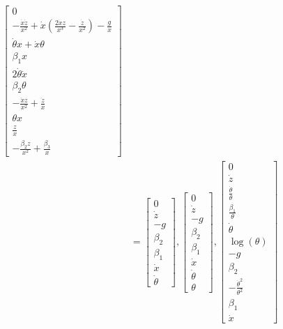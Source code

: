 \documentclass[12pt]{article}
\begin{document}
\begin{align*}
    \left[\begin{matrix}0\\- \frac{\dot{x} \dot{z}}{x^{2}} + \dot{x} \left(\frac{2 \dot{x} z}{x^{3}} - \frac{\dot{z}}{x^{2}}\right) - \frac{g}{x}\\\dot{\theta} x + \dot{x} \theta\\\beta_{1} x\\2 \dot{\theta} \dot{x}\\\beta_{2} \theta\\- \frac{\dot{x} z}{x^{2}} + \frac{\dot{z}}{x}\\\theta x\\\frac{z}{x}\\- \frac{\beta_{2} z}{x^{2}} + \frac{\beta_{3}}{x}\end{matrix}\right] \\
    &= \left[\begin{matrix}0\\\dot{z}\\- g\\\beta_{2}\\\beta_{1}\\\dot{x}\\\dot{\theta}\end{matrix}\right], 
    \left[\begin{matrix}0\\\dot{z}\\- g\\\beta_{2}\\\beta_{1}\\\dot{x}\\\dot{\theta}\\\theta\end{matrix}\right],
    \left[\begin{matrix}0\\\dot{z}\\\frac{\dot{\theta}}{\theta}\\\frac{\beta_{1}}{\theta}\\\dot{\theta}\\\log{\left(\theta \right)}\\- g\\\beta_{2}\\- \frac{\dot{\theta}^{2}}{\theta^{2}}\\\beta_{1}\\\dot{x}\end{matrix}\right]
\end{align*}
\end{document}
